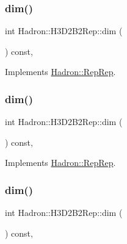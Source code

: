 \subsubsection{\texorpdfstring{dim()}{dim()}\hspace{0.1cm}{\footnotesize\ttfamily [3/5]}}
{\footnotesize\ttfamily int Hadron\+::\+H3\+D2\+B2\+Rep\+::dim (\begin{DoxyParamCaption}{ }\end{DoxyParamCaption}) const\hspace{0.3cm}{\ttfamily [inline]}, {\ttfamily [virtual]}}



Implements \mbox{\hyperlink{structHadron_1_1RepRep_a92c8802e5ed7afd7da43ccfd5b7cd92b}{Hadron\+::\+Rep\+Rep}}.

\mbox{\label{structHadron_1_1H3D2B2Rep_ad687c1e4069297e07ac09c437c3b5483}} 
\subsubsection{\texorpdfstring{dim()}{dim()}\hspace{0.1cm}{\footnotesize\ttfamily [4/5]}}
{\footnotesize\ttfamily int Hadron\+::\+H3\+D2\+B2\+Rep\+::dim (\begin{DoxyParamCaption}{ }\end{DoxyParamCaption}) const\hspace{0.3cm}{\ttfamily [inline]}, {\ttfamily [virtual]}}



Implements \mbox{\hyperlink{structHadron_1_1RepRep_a92c8802e5ed7afd7da43ccfd5b7cd92b}{Hadron\+::\+Rep\+Rep}}.

\mbox{\label{structHadron_1_1H3D2B2Rep_ad687c1e4069297e07ac09c437c3b5483}} 
\subsubsection{\texorpdfstring{dim()}{dim()}\hspace{0.1cm}{\footnotesize\ttfamily [5/5]}}
{\footnotesize\ttfamily int Hadron\+::\+H3\+D2\+B2\+Rep\+::dim (\begin{DoxyParamCaption}{ }\end{DoxyParamCaption}) const\hspace{0.3cm}{\ttfamily [inline]}, {\ttfamily [virtual]}}




